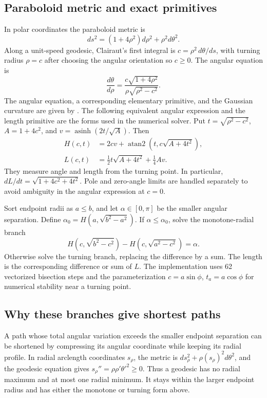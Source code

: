\documentclass[11pt]{article}
\theoremstyle{remark}\newtheorem{remark}[proposition]{Remark}
\newcommand{\asinh}{\operatorname{asinh}}
\begin{document}
\subsection{Paraboloid metric and exact primitives}\label{app:parab-geodesics}
In polar coordinates the paraboloid metric is
\begin{equation}\label{eq:parab-metric}
 ds^2=(1+4\rho^2)d\rho^2+\rho^2d\theta^2.
\end{equation}
Along a unit-speed geodesic, Clairaut's first integral is
$c=\rho^2\,d\theta/ds$, with turning radius $\rho=c$ after choosing the
angular orientation so $c\ge0$. The angular equation is
\begin{equation}
 \frac{d\theta}{d\rho}=
 \frac{c\sqrt{1+4\rho^2}}{\rho\sqrt{\rho^2-c^2}}.
\end{equation}
The angular equation, a corresponding elementary primitive, and the Gaussian
curvature are given by \citet[pp.~5--6, Eqs.~(9.2)--(9.4)]{wheeler2016}.
The following equivalent angular expression and the length primitive are
the forms used in the numerical solver. Put
$t=\sqrt{\rho^2-c^2}$, $A=1+4c^2$, and
$v=\asinh(2t/\sqrt A)$. Then
\begin{align}\label{eq:primitives}
 H(c,t)&=2cv+\operatorname{atan2}\!\left(t,c\sqrt{A+4t^2}\right),\\
 L(c,t)&=\frac12t\sqrt{A+4t^2}+\frac14Av.
\end{align}
They measure angle and length from the turning point. In particular,
$dL/dt=\sqrt{1+4c^2+4t^2}$. Pole and zero-angle limits are handled separately
to avoid ambiguity in the angular expression at $c=0$.

Sort endpoint radii as $a\le b$, and let $\alpha\in[0,\pi]$ be the smaller
angular separation. Define $\alpha_0=H(a,\sqrt{b^2-a^2})$. If
$\alpha\le\alpha_0$, solve the monotone-radial branch
\begin{equation}\label{eq:monotone}
 H(c,\sqrt{b^2-c^2})-H(c,\sqrt{a^2-c^2})=\alpha.
\end{equation}
Otherwise solve the turning branch, replacing the difference by a sum. The
length is the corresponding difference or sum of $L$. The implementation uses
62 vectorized bisection steps and the parameterization $c=a\sin\phi$,
$t_a=a\cos\phi$ for numerical stability near a turning point.

\subsection{Why these branches give shortest paths}
A path whose total angular variation exceeds the smaller endpoint separation
can be shortened by compressing its angular coordinate while keeping its
radial profile. In radial arclength coordinates $s_\rho$, the metric is
$ds_\rho^2+\rho(s_\rho)^2d\theta^2$, and the geodesic equation gives
$s_\rho''=\rho\rho'\theta'^2\ge0$. Thus a geodesic has no radial maximum and
at most one radial minimum. It stays within the larger endpoint radius and
has either the monotone or turning form above.
\end{document}
